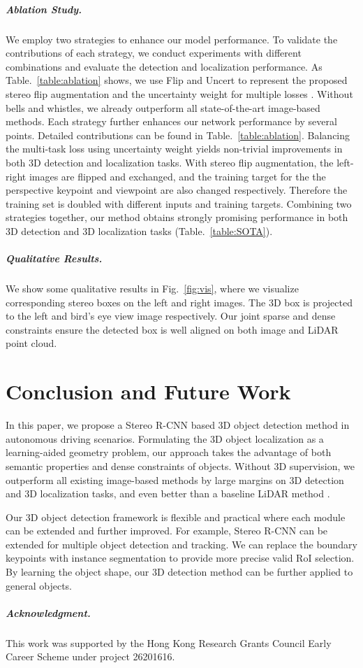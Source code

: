 \documentclass[10pt,twocolumn,letterpaper]{article}
\begin{document}
	\vspace{-0.2cm}
	{\setlength{\parindent}{0cm}
		\subparagraph*{Ablation Study.} We employ two strategies to enhance our model performance. To validate the contributions of each strategy, we conduct experiments with different combinations and evaluate the detection and localization performance. As Table.~\ref{table:ablation} shows, we use Flip and Uncert to represent the proposed stereo flip augmentation and the uncertainty weight for multiple losses \cite{kendall2017multi}. Without bells and whistles, we already outperform all state-of-the-art image-based methods. Each strategy further enhances our network performance by several points. Detailed contributions can be found in Table.~\ref{table:ablation}.
Balancing the multi-task loss using uncertainty weight yields non-trivial improvements in both 3D detection and localization tasks. With stereo flip augmentation, the left-right images are flipped and exchanged, and the training target for the the perspective keypoint and viewpoint are also changed respectively. Therefore the training set is doubled with different inputs and training targets.
 Combining two strategies together, our method obtains strongly promising performance in both 3D detection and 3D localization tasks (Table.~\ref{table:SOTA}).
}
		{\setlength{\parindent}{0cm}
		\subparagraph*{Qualitative Results.} We show some qualitative results in Fig.~\ref{fig:vis}, where we visualize corresponding stereo boxes on the left and right images. The 3D box is projected to the left and bird's eye view image respectively. Our joint sparse and dense constraints ensure the detected box is well aligned on both image and LiDAR point cloud.
	}
	\section{Conclusion and Future Work}
	In this paper, we propose a Stereo R-CNN based 3D object detection method in autonomous driving scenarios. Formulating the 3D object localization as a learning-aided geometry problem, our approach takes the advantage of both semantic properties and dense constraints of objects. Without 3D supervision, we outperform all existing image-based methods by large margins on 3D detection and 3D localization tasks, and even better than a baseline LiDAR method \cite{li2016vehicle}. 
	
	Our 3D object detection framework is flexible and practical where each module can be extended and further improved. For example, Stereo R-CNN can be extended for multiple object detection and tracking. We can replace the boundary keypoints with instance segmentation to provide more precise valid RoI selection. By learning the object shape, our 3D detection method can be further applied to general objects.


{\setlength{\parindent}{0cm}		
		\subparagraph*{Acknowledgment.} This work was supported by the Hong Kong Research Grants Council Early Career Scheme under project 26201616.		
		}

	{\small
		
		
	}
	
\end{document}
